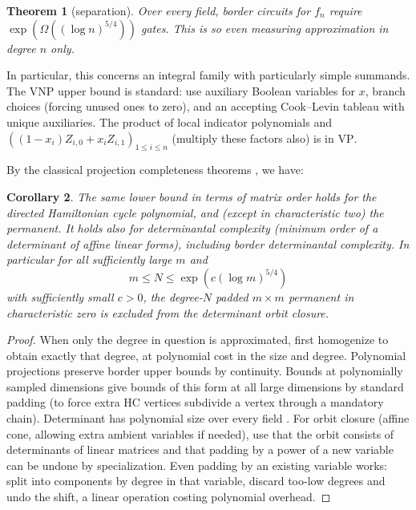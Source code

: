 \documentclass[11pt,letterpaper]{article}
\newtheorem{theorem}{Theorem}[section]
\newtheorem{corollary}[theorem]{Corollary}
\theoremstyle{definition}
\numberwithin{equation}{section}
\begin{document}
\begin{theorem}[separation]\label{thm:separation}
Over every field, border circuits for $f_n$ require $\exp(\Omega((\log n)^{5/4}))$
gates. This is so even measuring approximation in degree $n$ only.
\end{theorem}

In particular, this concerns an integral family with particularly simple summands. The
$\mathrm{VNP}$ upper bound is standard: use auxiliary Boolean variables for $x$, branch choices (forcing
unused ones to zero), and an accepting Cook--Levin tableau \cite{Cook71,Levin} with unique auxiliaries.
The product of local indicator polynomials and $((1-x_i)Z_{i,0}+x_i Z_{i,1})_{1\le i\le n}$ (multiply these
factors also) is in $\mathrm{VP}$.

By the classical projection completeness theorems \cite{Valiant,ValiantProjections,Burgisser,BC2024}, we have:

\begin{corollary}\label{thm:projections}
The same lower bound in terms of matrix order holds for the directed
Hamiltonian cycle polynomial, and (except in characteristic two) the permanent. It holds
also for determinantal complexity (minimum order of a determinant of affine linear forms),
including border determinantal complexity. In particular for all sufficiently large $m$ and
\[
  m\le N\le \exp(c(\log m)^{5/4})
\]
with sufficiently small $c>0$, the degree-$N$ padded $m\times m$ permanent in characteristic zero is
excluded from the determinant orbit closure.
\end{corollary}

\begin{proof}
When only the degree in question is approximated, first homogenize to obtain exactly
that degree, at polynomial cost in the size and degree. Polynomial projections preserve
border upper bounds by continuity. Bounds at polynomially sampled dimensions give bounds
of this form at all large dimensions by standard padding (to force extra HC vertices subdivide
a vertex through a mandatory chain). Determinant has polynomial size over every field \cite{MahajanVinay}.
For orbit closure (affine cone, allowing extra ambient variables if needed), use that the orbit
consists of determinants of linear matrices and that padding by a power of a new variable
can be undone by specialization. Even padding by an existing variable works: split into
components by degree in that variable, discard too-low degrees and undo the shift, a linear
operation costing polynomial overhead.
\end{proof}
\end{document}
